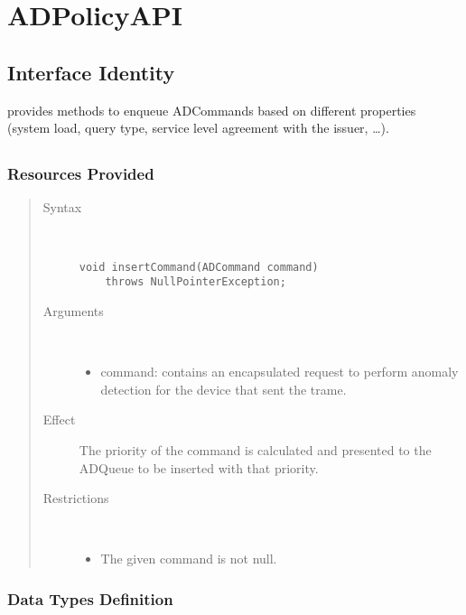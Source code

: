 \section{ADPolicyAPI}
\label{api:ad-policy-api}

\subsection{Interface Identity}

\npar {} provides methods to enqueue
ADCommands based on different properties (system load, query type,
service level agreement with the issuer, \ldots).

\subsection{}

\subsubsection{Resources Provided}

\begin{quote}
	\begin{description}
		\item[Syntax] \ 
		\begin{verbatim}
void insertCommand(ADCommand command) 
    throws NullPointerException;
		\end{verbatim}
		\item[Arguments] \
		\begin{itemize}
			\item command: contains an encapsulated request to perform anomaly detection
			for the device that sent the trame.
		\end{itemize}
		\item[Effect] The priority of the command is calculated and presented to the
		ADQueue to be inserted with that priority.
		\item[Restrictions] \ 
		\begin{itemize}
			\item The given command is not null.
		\end{itemize}
	\end{description} 
\end{quote}

\subsubsection{Data Types Definition}

